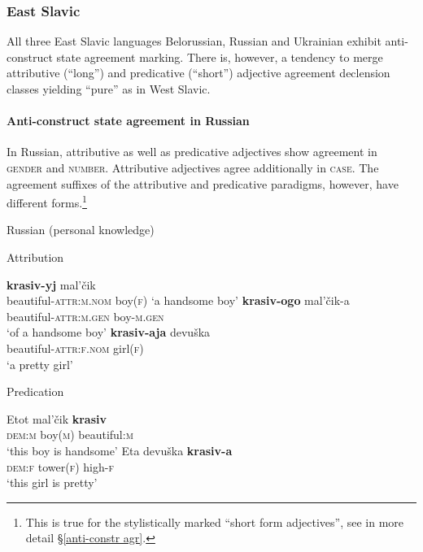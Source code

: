 \subsubsection{East Slavic}
All three East Slavic languages Belorussian, Russian and Ukrainian exhibit anti\hyp{}construct state agreement marking. There is, however, a tendency to merge attributive (“long”) and predicative (“short”) adjective agreement declension classes yielding “pure”  as in West Slavic.

\paragraph*{Anti\hyp{}construct state agreement in Russian} \label{russian synchr}
In Russian, attributive as well as predicative adjectives show agreement in \textsc{gender} and \textsc{number}. Attributive adjectives agree additionally in \textsc{case}. The agreement suffixes of the attributive and predicative paradigms, however, have different forms.\footnote{This is true for the stylistically marked “short form adjectives”, see in more detail \S\ref{anti-constr agr}.}
\begin{exe}
\ex \rm{Russian (personal knowledge)}
\label{ru agr}
\begin{xlist}
\label{ru attr}
\ex \rm{Attribution}
\begin{xlist}
\ex	\textbf{krasiv-yj}			mal'čik\\
	beautiful-\textsc{attr:m.nom} 	boy(\textsc{f})
\glt	‘a handsome boy’
\ex	
\gll	\textbf{krasiv-ogo}			mal'čik-a\\
	beautiful-\textsc{attr:m.gen}	boy-\textsc{m.gen}\\
\glt	‘of a handsome boy’
\ex
\gll 	\textbf{krasiv-aja} 			devuška\\
	beautiful-\textsc{attr:f.nom}	girl(\textsc{f})\\
\glt	 ‘a pretty girl’
\end{xlist}
\ex \rm{Predication}
\begin{xlist}
\ex
\gll 	Etot 			mal'čik		\textbf{krasiv}\\
	\textsc{dem:m} boy(\textsc{m}) 	beautiful:\textsc{m}\\
\glt	 ‘this boy is handsome’
\ex	
\gll	Eta 			devuška		\textbf{krasiv-a}\\
	\textsc{dem:f} tower(\textsc{f}) 	high-\textsc{f}\\
\glt	‘this girl is pretty’
\end{xlist}
\end{xlist}
\end{exe}
